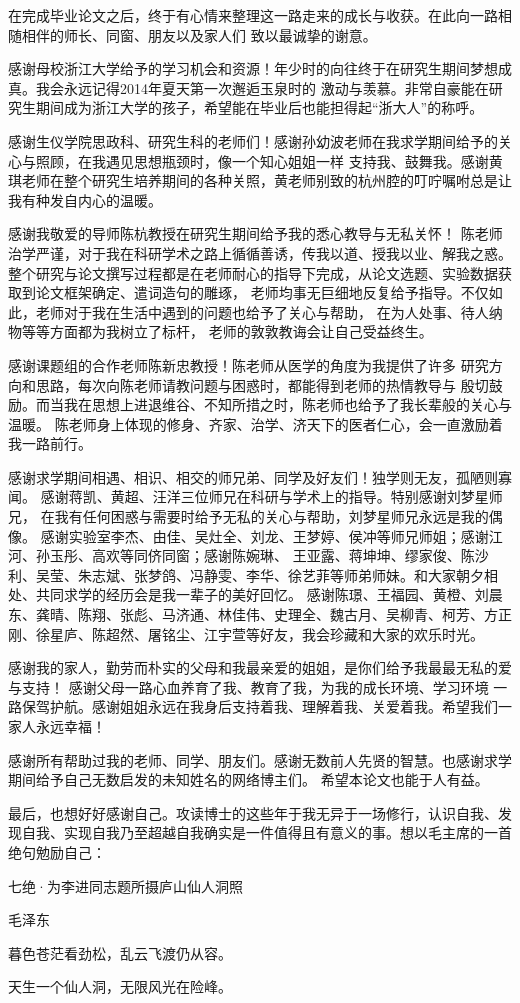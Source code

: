 \cleardoublepage
{}

在完成毕业论文之后，终于有心情来整理这一路走来的成长与收获。在此向一路相随相伴的师长、同窗、朋友以及家人们
致以最诚挚的谢意。

感谢母校浙江大学给予的学习机会和资源！年少时的向往终于在研究生期间梦想成真。我会永远记得2014年夏天第一次邂逅玉泉时的
激动与羡慕。非常自豪能在研究生期间成为浙江大学的孩子，希望能在毕业后也能担得起“浙大人”的称呼。

感谢生仪学院思政科、研究生科的老师们！感谢孙幼波老师在我求学期间给予的关心与照顾，在我遇见思想瓶颈时，像一个知心姐姐一样
支持我、鼓舞我。感谢黄琪老师在整个研究生培养期间的各种关照，黄老师别致的杭州腔的叮咛嘱咐总是让我有种发自内心的温暖。

感谢我敬爱的导师陈杭教授在研究生期间给予我的悉心教导与无私关怀！
陈老师治学严谨，对于我在科研学术之路上循循善诱，传我以道、授我以业、解我之惑。
整个研究与论文撰写过程都是在老师耐心的指导下完成，从论文选题、实验数据获取到论文框架确定、遣词造句的雕琢，
老师均事无巨细地反复给予指导。不仅如此，老师对于我在生活中遇到的问题也给予了关心与帮助，
在为人处事、待人纳物等等方面都为我树立了标杆，
老师的敦敦教诲会让自己受益终生。

感谢课题组的合作老师陈新忠教授！陈老师从医学的角度为我提供了许多
研究方向和思路，每次向陈老师请教问题与困惑时，都能得到老师的热情教导与
殷切鼓励。而当我在思想上进退维谷、不知所措之时，陈老师也给予了我长辈般的关心与温暖。
陈老师身上体现的修身、齐家、治学、济天下的医者仁心，会一直激励着我一路前行。

感谢求学期间相遇、相识、相交的师兄弟、同学及好友们！独学则无友，孤陋则寡闻。
感谢蒋凯、黄超、汪洋三位师兄在科研与学术上的指导。特别感谢刘梦星师兄，
在我有任何困惑与需要时给予无私的关心与帮助，刘梦星师兄永远是我的偶像。
感谢实验室李杰、由佳、吴灶全、刘龙、王梦婷、侯冲等师兄师姐；感谢江河、孙玉彤、高欢等同侪同窗；感谢陈婉琳、
王亚露、蒋坤坤、缪家俊、陈沙利、吴莹、朱志斌、张梦鸽、冯静雯、李华、徐艺菲等师弟师妹。和大家朝夕相处、共同求学的经历会是我一辈子的美好回忆。
感谢陈璟、王福园、黄橙、刘晨东、龚晴、陈翔、张彪、马济通、林佳伟、史理全、魏古月、吴柳青、柯芳、方正刚、徐星庐、陈超然、屠铭尘、江宇萱等好友，我会珍藏和大家的欢乐时光。

感谢我的家人，勤劳而朴实的父母和我最亲爱的姐姐，是你们给予我最最无私的爱与支持！
感谢父母一路心血养育了我、教育了我，为我的成长环境、学习环境
一路保驾护航。感谢姐姐永远在我身后支持着我、理解着我、关爱着我。希望我们一家人永远幸福！

感谢所有帮助过我的老师、同学、朋友们。感谢无数前人先贤的智慧。也感谢求学期间给予自己无数启发的未知姓名的网络博主们。
希望本论文也能于人有益。

最后，也想好好感谢自己。攻读博士的这些年于我无异于一场修行，认识自我、发现自我、实现自我乃至超越自我确实是一件值得且有意义的事。想以毛主席的一首绝句勉励自己：

\bigskip
\centerline{七绝·为李进同志题所摄庐山仙人洞照}
\centerline{毛泽东}
\centerline{暮色苍茫看劲松，乱云飞渡仍从容。}
\centerline{天生一个仙人洞，无限风光在险峰。}

